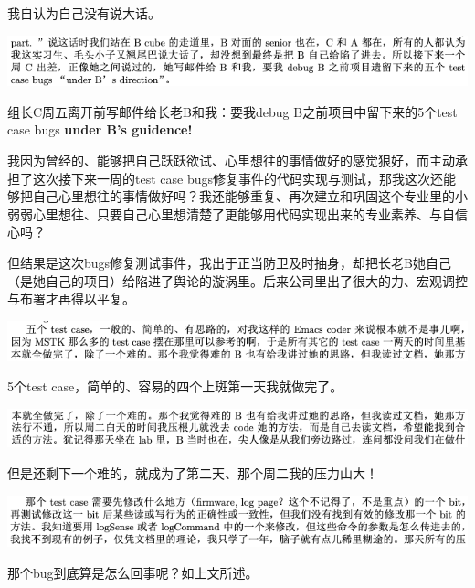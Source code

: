 \documentclass[9pt, b5paper]{article}
\begin{document}
我自认为自己没有说大话。

\begin{center}
\includegraphics[width=.9\linewidth]{./pic/backups_plans_20210507_110611.png}
\end{center}

组长C周五离开前写邮件给长老B和我：要我debug B之前项目中留下来的5个test case bugs \textbf{under B's guidence!} 

我因为曾经的、能够把自己跃跃欲试、心里想往的事情做好的感觉狠好，而主动承担了这次接下来一周的test case bugs修复事件的代码实现与测试，那我这次还能够把自己心里想往的事情做好吗？我还能够重复、再次建立和巩固这个专业里的小弱弱心里想往、只要自己心里想清楚了更能够用代码实现出来的专业素养、与自信心吗？

但结果是这次bugs修复测试事件，我出于正当防卫及时抽身，却把长老B她自己（是她自己的项目）给陷进了舆论的漩涡里。后来公司里出了很大的力、宏观调控与布署才再得以平复。

\begin{center}
\includegraphics[width=.9\linewidth]{./pic/backups_plans_20210507_113912.png}
\end{center}

5个test case，简单的、容易的四个上斑第一天我就做完了。 

\begin{center}
\includegraphics[width=.9\linewidth]{./pic/backups_plans_20210507_114031.png}
\end{center}

但是还剩下一个难的，就成为了第二天、那个周二我的压力山大！

\begin{center}
\includegraphics[width=.9\linewidth]{./pic/backups_plans_20210507_114156.png}
\end{center}

那个bug到底算是怎么回事呢？如上文所述。
\end{document}

